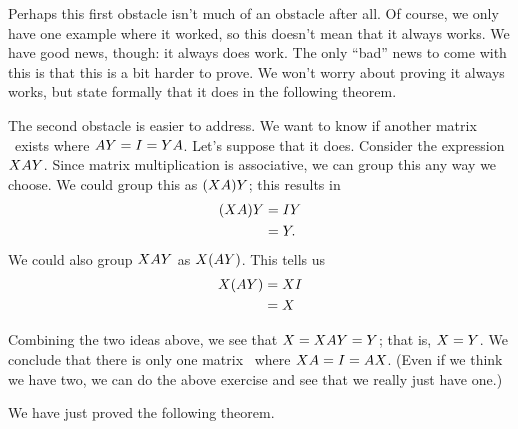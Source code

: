 Perhaps this first obstacle isn't much of an obstacle after all. Of course, we only have one example where it worked, so this doesn't mean that it always works. We have good news, though: it always does work. The only ``bad'' news to come with this is that this is a bit harder to prove. We won't worry about proving it always works, but state formally that it does in the following theorem.


The second obstacle is easier to address. We want to know if another matrix \tty\ exists where $AY = I =YA$. Let's suppose that it does. Consider the expression $XAY$. Since matrix multiplication is associative, we can group this any way we choose. We could group this as $(XA)Y$; this results in 
\begin{align*}
(XA)Y	&= IY\\
								&= Y.
\end{align*}
We could also group $XAY$ as $X(AY)$. This tells us 
\begin{align*}
X(AY) &= XI\\
		&= X
\end{align*}

Combining the two ideas above, we see that $X = XAY = Y$; that is, $X=Y$. We conclude that there is only one matrix \ttx\ where $XA = I = AX$. (Even if we think we have two, we can do the above exercise and see that we really just have one.)

We have just proved the following theorem.



